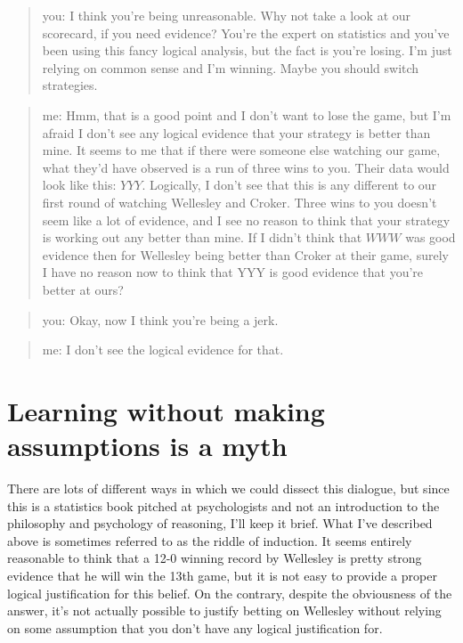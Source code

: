 \documentclass[
  letterpaper,
]{book}
\begin{document}
\begin{quote}
you: I think you're being unreasonable. Why not take a look at our
scorecard, if you need evidence? You're the expert on statistics and
you've been using this fancy logical analysis, but the fact is you're
losing. I'm just relying on common sense and I'm winning. Maybe you
should switch strategies.
\end{quote}

\begin{quote}
me: Hmm, that is a good point and I don't want to lose the game, but I'm
afraid I don't see any logical evidence that your strategy is better
than mine. It seems to me that if there were someone else watching our
game, what they'd have observed is a run of three wins to you. Their
data would look like this: \(YYY\). Logically, I don't see that this is
any different to our first round of watching Wellesley and Croker. Three
wins to you doesn't seem like a lot of evidence, and I see no reason to
think that your strategy is working out any better than mine. If I
didn't think that \(WWW\) was good evidence then for Wellesley being
better than Croker at their game, surely I have no reason now to think
that YYY is good evidence that you're better at ours?
\end{quote}

\begin{quote}
you: Okay, now I think you're being a jerk.
\end{quote}

\begin{quote}
me: I don't see the logical evidence for that.
\end{quote}

\hypertarget{learning-without-making-assumptions-is-a-myth}{%
\section*{Learning without making assumptions is a
myth}\label{learning-without-making-assumptions-is-a-myth}}

There are lots of different ways in which we could dissect this
dialogue, but since this is a statistics book pitched at psychologists
and not an introduction to the philosophy and psychology of reasoning,
I'll keep it brief. What I've described above is sometimes referred to
as the riddle of induction. It seems entirely reasonable to think that a
12-0 winning record by Wellesley is pretty strong evidence that he will
win the 13th game, but it is not easy to provide a proper logical
justification for this belief. On the contrary, despite the obviousness
of the answer, it's not actually possible to justify betting on
Wellesley without relying on some assumption that you don't have any
logical justification for.
\end{document}
